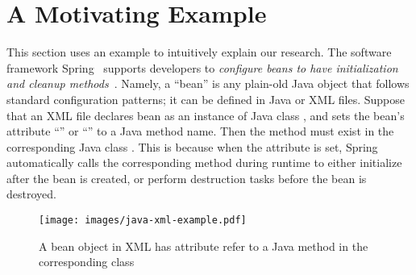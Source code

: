 \vspace{-.5em}
\section{A Motivating Example}\label{se:example}

This section uses an example to intuitively explain our research. The software framework Spring~\cite{spring} supports developers to \emph{configure beans to have initialization and cleanup methods}~\cite{init-destroy}. 
Namely, a ``bean'' is 
any plain-old Java object that follows standard configuration patterns; it can be defined in Java or XML files.
Suppose that an XML file declares bean  as an instance of Java class , and  
sets the bean's attribute ``'' or ``''  to a Java method name. Then the method must exist in the corresponding Java class . This is because when the attribute is set, Spring automatically calls the corresponding method during runtime to either initialize 
 after the bean is created, or  perform destruction tasks before the bean is destroyed.

\begin{figure}[h]
\vspace{-1.em}
    \centering
    \texttt{[image: images/java-xml-example.pdf]}
    \vspace{-2.5em}
    \caption{{A bean object in XML has attribute  refer to a Java method in the corresponding class}}
    \vspace{-1.em}
    \label{fig:example}
\end{figure}

